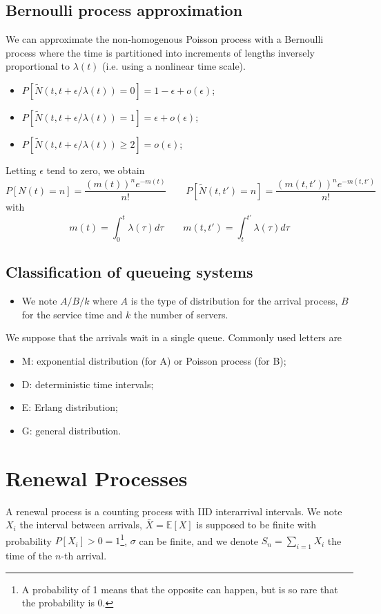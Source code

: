 \documentclass[12pt, openany]{report}
\newcommand{\E}{\mathbb{E}}
\theoremstyle{definition}
\begin{document}
\section{Bernoulli process approximation}
We can approximate the non-homogenous Poisson process with a Bernoulli process where the time is partitioned into increments of lengths inversely proportional to $\lambda (t)$ (i.e. using a nonlinear time scale).
\begin{itemize}
  \item $P[\tilde N(t,t+\epsilon/\lambda(t))=0]=1-\epsilon + o(\epsilon)$;
  \item $P[\tilde N(t,t+\epsilon/\lambda(t))=1]=\epsilon + o(\epsilon)$;
  \item $P[\tilde N(t,t+\epsilon/\lambda(t))\ge2]=o(\epsilon)$;
\end{itemize}
Letting $\epsilon$ tend to zero, we obtain
\begin{equation}
  P[N(t)=n]=\frac{(m(t))^ne^{-m(t)}}{n!}\qquad P[\tilde N(t,t')=n]=\frac{(m(t,t'))^n e^{-m(t,t')}}{n!}
\end{equation}
with 
\begin{equation}
  m(t)=\int_0^t \lambda(\tau)d\tau \qquad m(t,t')=\int_t^{t'} \lambda(\tau)d\tau 
\end{equation}
\section{Classification of queueing systems}
\begin{itemize}
  \item We note $A/B/k$ where $A$ is the type of distribution for the arrival process, $B$ for the service time and $k$ the number of servers.
\end{itemize}
We suppose that the arrivals wait in a single queue.
Commonly used letters are 
\begin{itemize}
  \item M: exponential distribution (for A) or Poisson process (for B);
  \item D: deterministic time intervals;
  \item E: Erlang distribution;
  \item G: general distribution.
\end{itemize}
\chapter{Renewal Processes}
A renewal process is a counting process with IID interarrival intervals. We note $X_i$ the interval between arrivals, $\bar X=\E[X]$ is supposed to be finite with probability $P[X_i]>0=1$\footnote{A probability of 1 means that the opposite can happen, but is so rare that the probability is 0.}, $\sigma$ can be finite, and we denote $S_n=\sum_{i=1} X_i$ the time of the $n$-th arrival.\\
\end{document}
